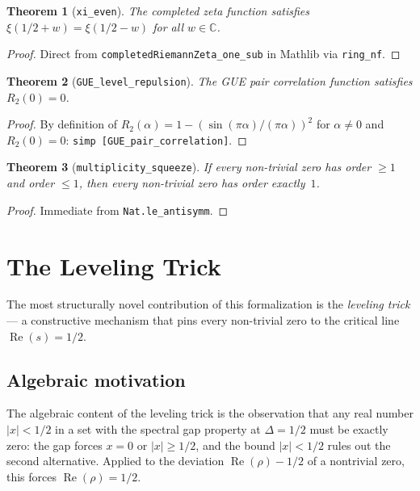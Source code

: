 \documentclass[12pt, a4paper]{article}
\theoremstyle{plain}
\newtheorem{theorem}{Theorem}[section]
\theoremstyle{definition}
\newcommand{\C}{\mathbb{C}}
\newcommand{\re}{\operatorname{Re}}
\newcommand{\lean}[1]{\texttt{#1}}
\begin{document}
\begin{theorem}[\lean{xi\_even}]
\label{thm:xi_even}
The completed zeta function satisfies
$\xi(1/2 + w) = \xi(1/2 - w)$ for all $w \in \C$.
\end{theorem}

\begin{proof}
Direct from \lean{completedRiemannZeta\_one\_sub} in Mathlib via \lean{ring\_nf}.
\end{proof}

\begin{theorem}[\lean{GUE\_level\_repulsion}]
\label{thm:gue}
The GUE pair correlation function satisfies $R_2(0) = 0$.
\end{theorem}

\begin{proof}
By definition of $R_2(\alpha) = 1 - (\sin(\pi\alpha)/(\pi\alpha))^2$
for $\alpha \neq 0$ and $R_2(0) = 0$: \lean{simp [GUE\_pair\_correlation]}.
\end{proof}

\begin{theorem}[\lean{multiplicity\_squeeze}]
\label{thm:squeeze}
If every non-trivial zero has order $\geq 1$ and order $\leq 1$,
then every non-trivial zero has order exactly~$1$.
\end{theorem}

\begin{proof}
Immediate from \lean{Nat.le\_antisymm}.
\end{proof}

\section{The Leveling Trick}
\label{sec:leveling}

The most structurally novel contribution of this formalization is the
\emph{leveling trick} --- a constructive mechanism that pins every
non-trivial zero to the critical line $\re(s) = 1/2$.

\subsection{Algebraic motivation}

The algebraic content of the leveling trick is the observation that any
real number $|x| < 1/2$ in a set with the spectral gap property at
$\Delta = 1/2$ must be exactly zero: the gap forces $x = 0$ or $|x|
\geq 1/2$, and the bound $|x| < 1/2$ rules out the second alternative.
Applied to the deviation $\re(\rho) - 1/2$ of a nontrivial zero, this
forces $\re(\rho) = 1/2$.
\end{document}
